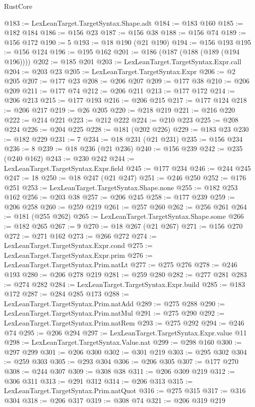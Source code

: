 \begin{lexlean}{RustCore}
\begin{coremodule}
@183 := LexLeanTarget.TargetSyntax.Shape.adt
@184 := @183 @160
@185 := @182 @184
@186 := @156 @23
@187 := @156 @38
@188 := @156 @74
@189 := @156 @172
@190 := 5
@193 := @18 @190 (@21 @190)
@194 := @156 @193
@195 := @156 @124
@196 := @195 @162
@201 := @186 (@187 (@188 (@189 (@194 @196))))
@202 := @185 @201
@203 := LexLeanTarget.TargetSyntax.Expr.call
@204 := @203 @23
@205 := LexLeanTarget.TargetSyntax.Expr
@206 := @2 @205
@207 := @177 @23
@208 := @206 @207
@209 := @177 @38
@210 := @206 @209
@211 := @177 @74
@212 := @206 @211
@213 := @177 @172
@214 := @206 @213
@215 := @177 @193
@216 := @206 @215
@217 := @177 @124
@218 := @206 @217
@219 := @26 @205
@220 := @218 @219
@221 := @216 @220
@222 := @214 @221
@223 := @212 @222
@224 := @210 @223
@225 := @208 @224
@226 := @204 @225
@228 := @181 (@202 @226)
@229 := @183 @23
@230 := @182 @229
@231 := 7
@234 := @18 @231 (@21 @231)
@235 := @156 @234
@236 := 8
@239 := @18 @236 (@21 @236)
@240 := @156 @239
@242 := @235 (@240 @162)
@243 := @230 @242
@244 := LexLeanTarget.TargetSyntax.Expr.field
@245 := @177 @234
@246 := @244 @245
@247 := 18
@250 := @18 @247 (@21 @247)
@251 := @246 @250
@252 := @176 @251
@253 := LexLeanTarget.TargetSyntax.Shape.none
@255 := @182 @253 @162
@256 := @203 @38
@257 := @206 @245
@258 := @177 @239
@259 := @206 @258
@260 := @259 @219
@261 := @257 @260
@262 := @256 @261
@264 := @181 (@255 @262)
@265 := LexLeanTarget.TargetSyntax.Shape.some
@266 := @182 @265
@267 := 9
@270 := @18 @267 (@21 @267)
@271 := @156 @270
@272 := @271 @162
@273 := @266 @272
@274 := LexLeanTarget.TargetSyntax.Expr.cond
@275 := LexLeanTarget.TargetSyntax.Expr.prim
@276 := LexLeanTarget.TargetSyntax.Prim.natLt
@277 := @275 @276
@278 := @246 @193
@280 := @206 @278 @219
@281 := @259 @280
@282 := @277 @281
@283 := @274 @282
@284 := LexLeanTarget.TargetSyntax.Expr.build
@285 := @183 @172
@287 := @284 @285 @173
@288 := LexLeanTarget.TargetSyntax.Prim.natAdd
@289 := @275 @288
@290 := LexLeanTarget.TargetSyntax.Prim.natMul
@291 := @275 @290
@292 := LexLeanTarget.TargetSyntax.Prim.natRem
@293 := @275 @292
@294 := @246 @74
@295 := @206 @294
@297 := LexLeanTarget.TargetSyntax.Expr.value @11
@298 := LexLeanTarget.TargetSyntax.Value.nat
@299 := @298 @160
@300 := @297 @299
@301 := @206 @300
@302 := @301 @219
@303 := @295 @302
@304 := @259 @303
@305 := @293 @304
@306 := @206 @305
@307 := @177 @270
@308 := @244 @307
@309 := @308 @38
@311 := @206 @309 @219
@312 := @306 @311
@313 := @291 @312
@314 := @206 @313
@315 := LexLeanTarget.TargetSyntax.Prim.natQuot
@316 := @275 @315
@317 := @316 @304
@318 := @206 @317
@319 := @308 @74
@321 := @206 @319 @219

\end{coremodule}
\end{lexlean}
